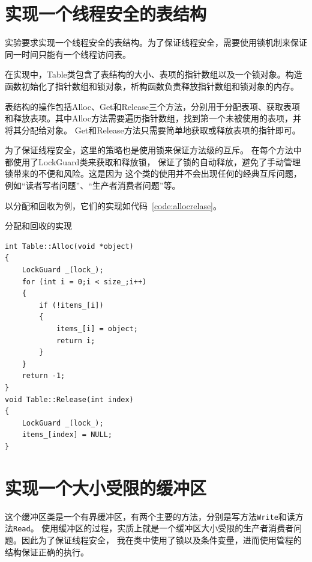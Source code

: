 \documentclass[a4paper,twoside]{article}
\begin{document}
\begin{spacing}{1.2}
\section{实现一个线程安全的表结构}

实验要求实现一个线程安全的表结构。为了保证线程安全，需要使用锁机制来保证同一时间只能有一个线程访问表。

在实现中，Table类包含了表结构的大小、表项的指针数组以及一个锁对象。构造函数初始化了指针数组和锁对象，析构函数负责释放指针数组和锁对象的内存。

表结构的操作包括Alloc、Get和Release三个方法，分别用于分配表项、获取表项和释放表项。其中Alloc方法需要遍历指针数组，找到第一个未被使用的表项，并将其分配给对象。
Get和Release方法只需要简单地获取或释放表项的指针即可。

为了保证线程安全，这里的策略也是使用锁来保证方法级的互斥。
在每个方法中都使用了LockGuard类来获取和释放锁，
保证了锁的自动释放，避免了手动管理锁带来的不便和风险。这是因为
这个类的使用并不会出现任何的经典互斥问题，例如“读者写者问题”、“生产者消费者问题”等。

以分配和回收为例，它们的实现如代码~\ref{code:allocrelase}。
\begin{listing}[htb]
	\caption{分配和回收的实现}
	\label{code:allocrelase}
	\begin{verbatim}
int Table::Alloc(void *object)
{
    LockGuard _(lock_);
    for (int i = 0;i < size_;i++)
    {
        if (!items_[i])
        {
            items_[i] = object;
            return i;
        }
    }
    return -1;
}
void Table::Release(int index)
{
    LockGuard _(lock_);
    items_[index] = NULL;
}
	\end{verbatim}
\end{listing}


\clearpage
\section{实现一个大小受限的缓冲区}

这个缓冲区类是一个有界缓冲区，有两个主要的方法，分别是写方法\texttt{Write}和读方法\texttt{Read}。
使用缓冲区的过程，实质上就是一个缓冲区大小受限的生产者消费者问题。因此为了保证线程安全，
我在类中使用了锁以及条件变量，进而使用管程的结构保证正确的执行。


\end{spacing}
\end{document}
